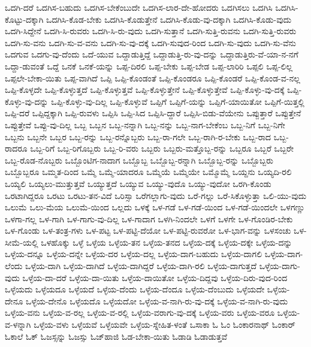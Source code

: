 {ಒದಗಿ-ದರೆ
ಒದಗಿಸ-ಬಹುದು
ಒದಗಿಸ-ಬೇಕೆಂಬುದೇ
ಒದಗಿಸ-ಲಾರ-ದೇ-ಹೋದರು
ಒದಗಿಸಲು
ಒದಗಿಸಿ
ಒದಗಿಸಿ-ಕೊಟ್ಟು-ದಕ್ಕಾಗಿ
ಒದಗಿಸಿ-ಕೊಡ-ಬೇಕು
ಒದಗಿಸಿ-ಕೊಡುತ್ತೇನೆ
ಒದಗಿಸಿ-ಕೊಡು-ವು-ದಕ್ಕಾಗಿ
ಒದಗಿಸಿ-ಕೊಡು-ವುದು
ಒದಗಿ-ಸಿದ್ದೇನೆ
ಒದಗಿ-ಸಿ-ರುವರು
ಒದಗಿ-ಸಿ-ರು-ವುದು
ಒದಗಿ-ಸುತ್ತಾನೆ
ಒದಗಿ-ಸುತ್ತಿ-ರುವನು
ಒದಗಿ-ಸುತ್ತಿ-ರುವರು
ಒದಗಿ-ಸು-ವನು
ಒದಗಿ-ಸು-ವ-ವನು
ಒದಗಿ-ಸು-ವು-ದಕ್ಕೆ
ಒದಗಿ-ಸುವುದ-ರಿಂದ
ಒದಗಿ-ಸು-ವುದು
ಒದಗಿ-ಸು-ವೆನು
ಒದಗುವ
ಒದಗು-ವು-ದೆಂದು
ಒದೆ-ಯುವ
ಒದ್ದಾಡುತ್ತಿದ್ದೆ
ಒದ್ದಾಡುತ್ತಿ-ರು-ವು-ದನ್ನು
ಒದ್ದಾಡುತ್ತಿರು-ವೆ-ಯಾ-ನ-ನಗೆ
ಒದ್ದಾ-ಡುವಂತೆ
ಒದ್ದೆ
ಒನಕೆ
ಒನಕೆ-ಯನ್ನು
ಒಪ್ಪ-ದಿರಲಿ
ಒಪ್ಪ-ಬೇಕು
ಒಪ್ಪ-ಬೇಡ
ಒಪ್ಪ-ಲಾರಿರಿ
ಒಪ್ಪಲಿ
ಒಪ್ಪ-ಲಿಲ್ಲ
ಒಪ್ಪಲೇ-ಬೇಕಾ-ಯಿತು
ಒಪ್ಪ-ವಾಗಿದೆ
ಒಪ್ಪಿ
ಒಪ್ಪಿ-ಕೊಂಡಂತೆ
ಒಪ್ಪಿ-ಕೊಂಡರೂ
ಒಪ್ಪಿ-ಕೊಂಡರೆ
ಒಪ್ಪಿ-ಕೊಂಡ-ವ-ನಲ್ಲ
ಒಪ್ಪಿ-ಕೊಳ್ಳದೇ
ಒಪ್ಪಿ-ಕೊಳ್ಳುತ್ತದೆ
ಒಪ್ಪಿ-ಕೊಳ್ಳುತ್ತವೆ
ಒಪ್ಪಿ-ಕೊಳ್ಳುತ್ತೇನೆ
ಒಪ್ಪಿ-ಕೊಳ್ಳುತ್ತೇವೆ
ಒಪ್ಪಿ-ಕೊಳ್ಳು-ವು-ದಕ್ಕೆ
ಒಪ್ಪಿ-ಕೊಳ್ಳು-ವು-ದನ್ನು
ಒಪ್ಪಿ-ಕೊಳ್ಳು-ವು-ದಿಲ್ಲ
ಒಪ್ಪಿ-ಕೊಳ್ಳುವೆ
ಒಪ್ಪಿಗೆ
ಒಪ್ಪಿಗೆ-ಯನ್ನು
ಒಪ್ಪಿಗೆ-ಯಾಯಿತೋ
ಒಪ್ಪಿಗೆ-ಯಿತ್ತಲ್ಲಿ
ಒಪ್ಪಿ-ದರೆ
ಒಪ್ಪಿದ್ದಕ್ಕಾಗಿ
ಒಪ್ಪಿ-ರುವಳು
ಒಪ್ಪಿಸಿ
ಒಪ್ಪಿ-ಸಿದ
ಒಪ್ಪಿಸಿ-ದ್ದಾರೆ
ಒಪ್ಪಿಸಿ-ಬಿಡು-ವೆಯೇನು
ಒಪ್ಪುತ್ತಾರೆ
ಒಪ್ಪುತ್ತೇನೆ
ಒಪ್ಪುತ್ತೇವೆ
ಒಪ್ಪು-ವು-ದಿಲ್ಲ
ಒಬ್ಬ
ಒಬ್ಬನ
ಒಬ್ಬ-ನನ್ನಾಗಿ
ಒಬ್ಬ-ನನ್ನು
ಒಬ್ಬ-ನಾಗ-ಬೇಕೆಂಬ
ಒಬ್ಬ-ನಿಗೆ
ಒಬ್ಬ-ನಿಗೇ
ಒಬ್ಬನು
ಒಬ್ಬನೇ
ಒಬ್ಬರ
ಒಬ್ಬ-ರನ್ನು
ಒಬ್ಬ-ರನ್ನೊಬ್ಬರು
ಒಬ್ಬ-ರಾ-ಗಲೇ
ಒಬ್ಬ-ರಾಗಿ-ರ-ಬೇಕು
ಒಬ್ಬ-ರಾದ
ಒಬ್ಬ-ರಾದರೂ
ಒಬ್ಬ-ರಿಗೆ
ಒಬ್ಬ-ರಿಗೊಬ್ಬರು
ಒಬ್ಬ-ರಿ-ವರು
ಒಬ್ಬರು
ಒಬ್ಬರು-ಮತ್ತೊಬ್ಬ-ರನ್ನು
ಒಬ್ಬರೂ
ಒಬ್ಬರೆ
ಒಬ್ಬರೇ
ಒಬ್ಬ-ರೊಡ-ನೊಬ್ಬರು
ಒಬ್ಬೊಂಟಿಗ-ನಾದಾಗ
ಒಬ್ಬೊಬ್ಬ
ಒಬ್ಬೊಬ್ಬ-ರನ್ನಾಗಿ
ಒಬ್ಬೊಬ್ಬ-ರನ್ನು
ಒಬ್ಬೊಬ್ಬರು
ಒಬ್ಬೊಬ್ಬರೂ
ಒಮ್ಮತ-ದಿಂದ
ಒಮ್ಮೆ
ಒಮ್ಮೆ-ಯಾದರೂ
ಒಮ್ಮೆಯೆ
ಒಮ್ಮೆಯೇ
ಒಮ್ಮೊಮ್ಮೆ
ಒಯ್ದನು
ಒಯ್ಯದಿ-ರಲಿ
ಒಯ್ಯಲಿ
ಒಯ್ಯಲು-ಮುತ್ತುತ್ತವೆ
ಒಯ್ಯುತ್ತದೆ
ಒಯ್ಯುವ
ಒಯ್ಯು-ವುದೊ
ಒಯ್ಯು-ವುದೋ
ಒರಗಿ-ಕೊಂಡು
ಒರಟಾಗಿದ್ದರೂ
ಒರಟು
ಒರಟು-ತನ-ವಿದೆ
ಒರಿಸ್ಸಾ
ಒರೆಗಲ್ಲಾಗು-ವುದು
ಒರೆ-ಗಲ್ಲು
ಒರೆ-ಸಿಕೊಳ್ಳುತ್ತಾ
ಒಲಿ-ಯು-ವುದು
ಒಲುಮೆ
ಒಲು-ಮೆಯ
ಒಲುಮೆ-ಯಿಂದ
ಒಲ್ಲದು
ಒಳಕ್ಕೆ
ಒಳ-ಗಡೆ
ಒಳ-ಗಡೆ-ಯಿಂದ
ಒಳ-ಗಡೆ-ಯಿಂದಲೇ
ಒಳಗಣ್ಣು
ಒಳಗಾ-ಗಲ್ಲ
ಒಳ-ಗಾಗಿ
ಒಳ-ಗಾಗು-ವು-ದಿಲ್ಲ
ಒಳ-ಗಾದಾಗ
ಒಳಗಿ-ನಿಂದಲೇ
ಒಳಗೆ
ಒಳಗೇ
ಒಳ-ಗೊಂಡಿರ-ಬೇಕು
ಒಳ-ಗೊಂಡು
ಒಳ-ತಂತ್ರ-ಗಳು
ಒಳ-ಪಟ್ಟ
ಒಳ-ಪಟ್ಟಿ-ದೆಯೋ
ಒಳ-ಪಟ್ಟಿ-ರುವರೋ
ಒಳ-ಭಾಗ-ವನ್ನು
ಒಳಸಂಚು
ಒಳ-ಸೀಮೆ-ಯಲ್ಲಿ
ಒಳಹೊಕ್ಕು
ಒಳ್ಳೆ
ಒಳ್ಳೆಯ
ಒಳ್ಳೆಯ-ತನ
ಒಳ್ಳೆಯ-ತನದ
ಒಳ್ಳೆಯ-ದಕ್ಕೆ
ಒಳ್ಳೆಯ-ದಕ್ಕೇ
ಒಳ್ಳೆಯ-ದನ್ನು
ಒಳ್ಳೆಯ-ದನ್ನೂ
ಒಳ್ಳೆಯ-ದನ್ನೇ
ಒಳ್ಳೆಯ-ದರ
ಒಳ್ಳೆಯ-ದಲ್ಲ
ಒಳ್ಳೆಯ-ದಾಗ-ಬಹುದು
ಒಳ್ಳೆಯ-ದಾಗಲಿ
ಒಳ್ಳೆಯ-ದಾಗ-ಲೆಂದು
ಒಳ್ಳೆಯ-ದಾಗಿ
ಒಳ್ಳೆಯ-ದಾಗಿದೆ
ಒಳ್ಳೆಯ-ದಾಗಿದ್ದರೆ
ಒಳ್ಳೆಯ-ದಾಗಿ-ರಲಿ
ಒಳ್ಳೆಯ-ದಾಗುತ್ತದೆ
ಒಳ್ಳೆಯ-ದಾಗು-ವುದು
ಒಳ್ಳೆಯ-ದಾ-ದರೆ
ಒಳ್ಳೆಯ-ದಾ-ಯಿತು
ಒಳ್ಳೆಯ-ದಾಯಿತೋ
ಒಳ್ಳೆಯ-ದಿದ್ದವು
ಒಳ್ಳೆಯ-ದಿರು-ವುದ-ರಿಂದ
ಒಳ್ಳೆಯದು
ಒಳ್ಳೆಯದೂ
ಒಳ್ಳೆಯದೆ
ಒಳ್ಳೆಯ-ದೆಂದು
ಒಳ್ಳೆಯ-ದೆಂದೂ
ಒಳ್ಳೆಯ-ದೆಂಬುದು
ಒಳ್ಳೆಯದೇ
ಒಳ್ಳೆಯ-ದೇನೂ
ಒಳ್ಳೆಯ-ದೇನೊ
ಒಳ್ಳೆಯದೊ
ಒಳ್ಳೆಯದೋ
ಒಳ್ಳೆಯ-ವ-ನಾಗಿ-ರು-ವು-ದಕ್ಕೆ
ಒಳ್ಳೆಯ-ವ-ನಾಗಿ-ರು-ವುದು
ಒಳ್ಳೆಯ-ವನು
ಒಳ್ಳೆಯ-ವ-ರಲ್ಲ
ಒಳ್ಳೆಯ-ವ-ರಲ್ಲಿ
ಒಳ್ಳೆಯ-ವರಾಗು-ವು-ದಕ್ಕೆ
ಒಳ್ಳೆಯ-ವರು
ಒಳ್ಳೆಯ-ವರೂ
ಒಳ್ಳೆಯ-ವ-ಳನ್ನಾಗಿ
ಒಳ್ಳೆಯ-ವಳು
ಒಳ್ಳೆಯವೆ
ಒಳ್ಳೆಯವೇ
ಒಳ್ಳೆಯ-ಸ್ನೇಹಿತ-ಳಂತೆ
ಒಸಾಕಾ
ಓ
ಓಂ
ಓಂಕಾರನಾಥ್
ಓಂಕಾರ್
ಓಕಾಲೆ
ಓಕ್
ಓಜಸ್ಸನ್ನು
ಓಜಸ್ಸು
ಓಜ್‌ಹಾಜಿ
ಓಡ-ಬೇಕಾ-ಯಿತು
ಓಡಾಡಿ
ಓಡಾಡುತ್ತವೆ
}
